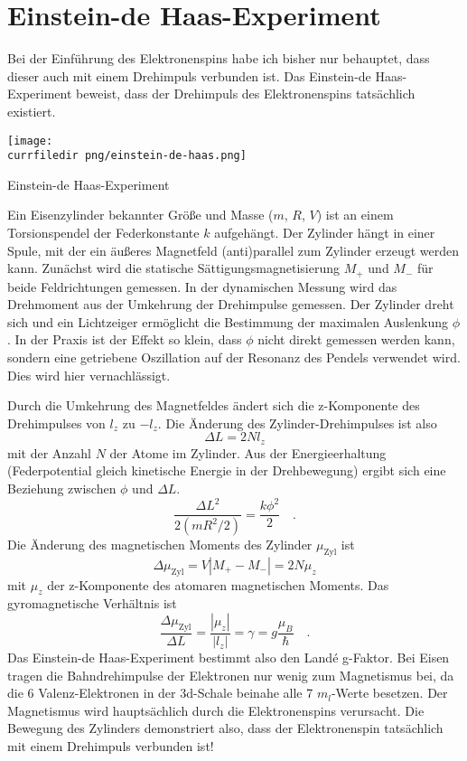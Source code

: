 \section{Einstein-de Haas-Experiment}


Bei der Einführung des Elektronenspins habe ich bisher nur behauptet, dass dieser auch mit einem Drehimpuls verbunden ist. Das Einstein-de Haas-Experiment beweist, dass der Drehimpuls des Elektronenspins tatsächlich existiert.

\begin{marginfigure}
    \texttt{[image: \\currfiledir png/einstein-de-haas.png]}
    \caption{Einstein-de Haas-Experiment}
\end{marginfigure}

Ein Eisenzylinder bekannter Größe und Masse ($m$, $R$, $V$) ist an einem Torsionspendel der Federkonstante $k$ aufgehängt. Der Zylinder hängt in einer Spule, mit der ein äußeres Magnetfeld (anti)parallel zum Zylinder erzeugt werden kann. Zunächst wird die statische Sättigungsmagnetisierung $M_+$ und $M_-$ für beide Feldrichtungen gemessen. In der dynamischen Messung wird das Drehmoment aus der Umkehrung der Drehimpulse gemessen. Der Zylinder dreht sich und ein Lichtzeiger ermöglicht die Bestimmung der maximalen Auslenkung $\phi$. In der Praxis ist der Effekt so klein, dass $\phi$ nicht direkt gemessen werden kann, sondern eine getriebene Oszillation auf der Resonanz des Pendels verwendet wird. Dies wird hier vernachlässigt. 

Durch die Umkehrung des Magnetfeldes ändert sich die z-Komponente des Drehimpulses von $l_z$ zu $-l_z$. Die Änderung des Zylinder-Drehimpulses ist also 
\begin{equation}
    \Delta L = 2 N l_z
\end{equation}
mit der Anzahl $N$ der Atome im Zylinder. Aus der Energieerhaltung (Federpotential gleich kinetische Energie in der Drehbewegung) ergibt sich eine Beziehung zwischen $\phi$ und $\Delta L$.
\begin{equation}
\frac{\Delta L ^2}{2 (mR^2/2)} = \frac{k \phi^2}{2}    \quad .  
\end{equation}
Die Änderung des magnetischen  Moments des Zylinder $\mu_\text{Zyl}$ ist
\begin{equation}
   \Delta  \mu_\text{Zyl} = V | M_+ - M_-| = 2 N \mu_z
\end{equation}
mit $\mu_z$ der z-Komponente des atomaren magnetischen Moments. Das gyromagnetische Verhältnis ist
\begin{equation}
    \frac{ \Delta  \mu_\text{Zyl}}{\Delta L}
    = \frac{|\mu_z|}{|l_z|} = \gamma = g \frac{\mu_B}{\hbar}  \quad .
\end{equation}
Das Einstein-de Haas-Experiment bestimmt also den Landé g-Faktor. Bei Eisen tragen die Bahndrehimpulse der Elektronen nur wenig zum Magnetismus bei, da die 6 Valenz-Elektronen in der  3d-Schale beinahe alle 7 $m_l$-Werte besetzen. 
Der Magnetismus wird hauptsächlich durch die Elektronenspins verursacht. Die Bewegung des Zylinders demonstriert also, dass der Elektronenspin tatsächlich mit einem Drehimpuls verbunden ist! 

